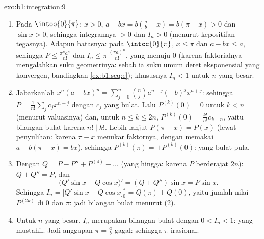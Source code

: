 \begin{solution}{exo:b1:integration:9}
\begin{enumerate}
  \item Pada $\intoo{0}{\pi}$: $x > 0$, $a - bx = b(\frac ab - x) =
        b(\pi - x) > 0$ dan $\sin x > 0$, sehingga integrannya $> 0$
        dan $I_n > 0$ (menurut kepositifan tegasnya). Adapun batasnya: pada
        $\intcc{0}{\pi}$, $x \leq \pi$ dan $a - bx \leq a$, sehingga $P
        \leq \frac{\pi^n a^n}{n!}$ dan $I_n \leq
        \pi\,\frac{(\pi a)^n}{n!}$, yang menuju $0$ (karena
        faktorialnya mengalahkan suku geometrinya: sebab ia suku umum
        deret eksponensial yang konvergen, bandingkan
        \cref{ex:b1:seq:e}); khususnya $I_n < 1$ untuk $n$ yang besar.
  \item Jabarkanlah $x^n(a - bx)^n = \sum_{j=0}^{n} \binom nj a^{n-j}
        (-b)^j x^{n+j}$: sehingga $P = \frac{1}{n!}\sum_j c_j x^{n+j}$
        dengan $c_j$ yang bulat. Lalu $P^{(k)}(0) = 0$ untuk $k < n$
        (menurut valuasinya) dan, untuk $n \leq k \leq 2n$, $P^{(k)}(0) =
        \frac{k!}{n!} c_{k-n}$, yaitu bilangan bulat karena $n! \mid k!$.
        Lebih lanjut $P(\pi - x) = P(x)$ (lewat penyulihan: karena $\pi - x$ menukar
        faktornya, dengan memakai $a - b(\pi - x) = bx$), sehingga $P^{(k)}(\pi)
        = \pm P^{(k)}(0)$: yang bulat pula.
  \item Dengan $Q = P - P'' + P^{(4)} - \dots$ (yang hingga: karena $P$ berderajat
        $2n$): $Q + Q'' = P$, dan
        \[
        \bigl(Q'\sin x - Q\cos x\bigr)' = (Q + Q'')\sin x = P\sin x .
        \]
        Sehingga $I_n = \bigl[Q'\sin x - Q\cos x\bigr]_0^{\pi} = Q(\pi)
        + Q(0)$, yaitu jumlah nilai $P^{(2k)}$ di $0$ dan $\pi$: jadi
        bilangan bulat menurut (2).
  \item Untuk $n$ yang besar, $I_n$ merupakan bilangan bulat dengan $0 < I_n < 1$:
        yang mustahil. Jadi anggapan $\pi = \frac ab$ gagal: sehingga $\pi$
        irasional.
\end{enumerate}
\end{solution}

